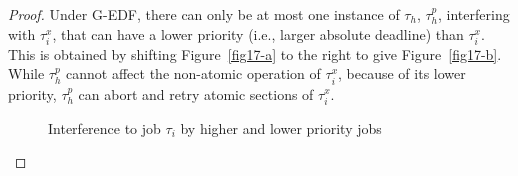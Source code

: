 \documentclass[conference]{IEEEtran}
\begin{document}
\begin{proof}
Under G-EDF, there can only be at most one instance of $\tau_{h}$, $\tau_{h}^{p}$, interfering with $\tau_i^x$, that can have a lower priority (i.e., larger absolute deadline) than $\tau_{i}^{x}$. This is obtained by shifting Figure~\ref{fig17-a} to the right to give Figure~\ref{fig17-b}. While $\tau_h^p$ cannot affect the non-atomic operation of $\tau_i^x$, because of its lower priority, $\tau_h^p$ can abort and retry atomic sections of $\tau_i^x$.

%
\begin{figure}
\caption{\label{fig17}Interference to job $\tau_{i}$ by higher and lower priority jobs}

\end{figure}


\end{proof}
\end{document}
